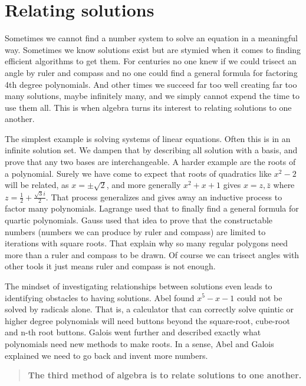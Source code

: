 
\section{Relating solutions}
Sometimes we cannot find a number system to solve an equation
in a meaningful way.  Sometimes we know solutions exist but are stymied 
when it comes to finding efficient algorithms to get them.  For centuries 
no one knew if we could trisect an angle by ruler and compass and no one 
could find a general formula for factoring 4th degree polynomials.  And other 
times we succeed far too well creating far too many solutions, 
maybe infinitely many, and we simply cannot expend the time to use them all.
This is when algebra turns its interest to relating solutions to one another.

The simplest example is solving systems of linear equations.  Often 
this is in an infinite solution set.  We dampen that by describing all 
solution with a basis, and prove that any two bases are interchangeable.
A harder example are the roots of a polynomial.  Surely we have come 
to expect that roots of quadratics like $x^2-2$ will be related, 
as $x=\pm \sqrt{2}$, and more generally $x^2+x+1$ gives 
$x=z,\bar{z}$ where $z=\frac{1}{2}+\frac{\sqrt{3}i}{2}$.  That process 
generalizes and gives away an inductive process to factor many polynomials.
Lagrange used that to finally  find a general formula for quartic polynomials.
Gauss used that idea to prove that the constructable numbers (numbers we can 
produce by ruler and compass) are limited to iterations with square roots.
That explain why so many regular polygons need more than a ruler and compass 
to be drawn.  Of course we can trisect angles with 
other tools it just means ruler and compass is not enough.

The mindset of investigating relationships between solutions even leads to
identifying obstacles to having solutions.  Abel found $x^5-x-1$ could not be
solved by radicals alone.  That is, a calculator that can correctly solve
quintic or higher degree polynomials will need buttons beyond the square-root,
cube-root and n-th root buttons.  Galois went further and described exactly what
polynomials need new methods to make roots.  In a sense, Abel and Galois
explained we need to go back and invent more numbers.

\begin{quote}
    \textbf{The third method of algebra is to relate solutions to one another.}
\end{quote}
